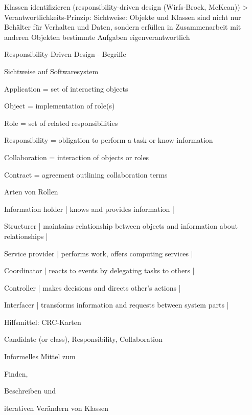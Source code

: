 \documentclass[a4paper]{article}
\begin{document}
\begin{multicols}{3}
  Klassen identifizieren (responsibility-driven design (Wirfs-Brock, McKean))
  > Verantwortlichkeits-Prinzip: Sichtweise: Objekte und Klassen sind nicht nur Behälter für Verhalten und Daten, sondern erfüllen in Zusammenarbeit mit anderen Objekten bestimmte Aufgaben eigenverantwortlich

  Responsibility-Driven Design - Begriffe
  \begin{itemize*}
    \item Sichtweise auf Softwaresystem
    \item Application = set of interacting objects
    \item Object = implementation of role(s)
    \item Role = set of related responsibilities
    \item Responsibility = obligation to perform a task or know information
    \item Collaboration = interaction of objects or roles
    \item Contract = agreement outlining collaboration terms
  \end{itemize*}

  Arten von Rollen

  \begin{itemize*}
    \item Information holder  | knows and provides information |
    \item Structurer | maintains relationship between objects and information about relationships |
    \item Service provider | performs work, offers computing services |
    \item Coordinator | reacts to events by delegating tasks to others |
    \item Controller | makes decisions and directs other’s actions |
    \item Interfacer | transforms information and requests between system parts |
  \end{itemize*}

  Hilfsmittel: CRC-Karten
  \begin{itemize*}
    \item Candidate (or class), Responsibility, Collaboration
    \item Informelles Mittel zum
    \begin{itemize*}
      \item Finden,
      \item Beschreiben und
      \item iterativen Verändern von Klassen
    \end{itemize*}
  \end{itemize*}


\end{multicols}
\end{document}
